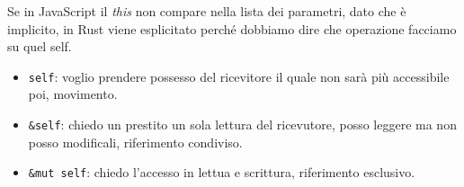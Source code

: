 Se in JavaScript il \textit{this} non compare nella lista dei parametri, dato che è implicito,
in Rust viene esplicitato perché dobbiamo dire che operazione facciamo su quel self.

\begin{itemize}
  \item \texttt{self}: voglio prendere possesso del ricevitore il quale non sarà più accessibile poi, movimento.
  \item \texttt{&self}: chiedo un prestito un sola lettura del ricevutore, posso leggere ma non posso modificali, riferimento condiviso.
  \item \texttt{&mut self}: chiedo l'accesso in lettua e scrittura, riferimento esclusivo.
\end{itemize}




